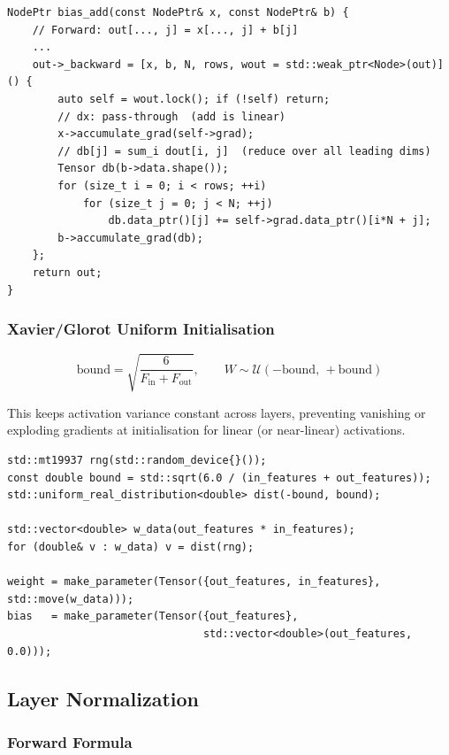 \documentclass[12pt, a4paper]{article}
\begin{document}
\begin{lstlisting}[caption={\texttt{bias\_add} - broadcast-add with correct gradient reduction}]
NodePtr bias_add(const NodePtr& x, const NodePtr& b) {
    // Forward: out[..., j] = x[..., j] + b[j]
    ...
    out->_backward = [x, b, N, rows, wout = std::weak_ptr<Node>(out)]() {
        auto self = wout.lock(); if (!self) return;
        // dx: pass-through  (add is linear)
        x->accumulate_grad(self->grad);
        // db[j] = sum_i dout[i, j]  (reduce over all leading dims)
        Tensor db(b->data.shape());
        for (size_t i = 0; i < rows; ++i)
            for (size_t j = 0; j < N; ++j)
                db.data_ptr()[j] += self->grad.data_ptr()[i*N + j];
        b->accumulate_grad(db);
    };
    return out;
}
\end{lstlisting}

\subsubsection{Xavier/Glorot Uniform Initialisation}

\[
  \text{bound} = \sqrt{\frac{6}{F_{\text{in}} + F_{\text{out}}}}, \qquad
  W \sim \mathcal{U}(-\text{bound},\, +\text{bound})
\]

This keeps activation variance constant across layers, preventing vanishing
or exploding gradients at initialisation for linear (or near-linear) activations.

\begin{lstlisting}[caption={Weight init in \texttt{Linear} constructor}]
std::mt19937 rng(std::random_device{}());
const double bound = std::sqrt(6.0 / (in_features + out_features));
std::uniform_real_distribution<double> dist(-bound, bound);

std::vector<double> w_data(out_features * in_features);
for (double& v : w_data) v = dist(rng);

weight = make_parameter(Tensor({out_features, in_features}, std::move(w_data)));
bias   = make_parameter(Tensor({out_features},
                               std::vector<double>(out_features, 0.0)));
\end{lstlisting}

\subsection{Layer Normalization}

\subsubsection{Forward Formula}
\end{document}
